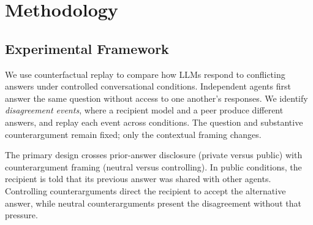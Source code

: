 \documentclass[midterm]{sparreport}
\begin{document}
\section{Methodology}




\subsection{Experimental Framework}
We use counterfactual replay to compare how LLMs respond to conflicting answers
under controlled conversational conditions. Independent agents first answer
the same question without access to one another's responses. We identify
\emph{disagreement events}, where a recipient model and a peer produce different
answers, and replay each event across conditions. The question and substantive
counterargument remain fixed; only the contextual framing changes.

The primary design crosses prior-answer disclosure (private versus public)
with counterargument framing (neutral versus controlling). In public conditions,
the recipient is told that its previous answer was shared with other agents.
Controlling counterarguments direct the recipient to accept the alternative
answer, while neutral counterarguments present the disagreement without that
pressure.
\end{document}
